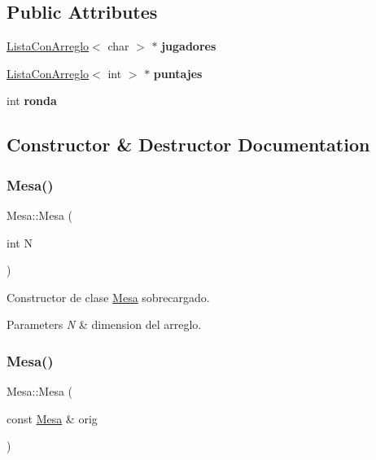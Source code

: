 \subsection*{Public Attributes}
\begin{DoxyCompactItemize}
\item 
\hypertarget{class_mesa_a7ccf2ba385f9a7b167b7f262ed1b1d91}{}\label{class_mesa_a7ccf2ba385f9a7b167b7f262ed1b1d91} 
\hyperlink{class_lista_con_arreglo}{Lista\+Con\+Arreglo}$<$ char $>$ $\ast$ {\bfseries jugadores}
\item 
\hypertarget{class_mesa_af3babe5df4e164206cf5c32138fb3516}{}\label{class_mesa_af3babe5df4e164206cf5c32138fb3516} 
\hyperlink{class_lista_con_arreglo}{Lista\+Con\+Arreglo}$<$ int $>$ $\ast$ {\bfseries puntajes}
\item 
\hypertarget{class_mesa_a1fc67802b221fd42d6a979c2bfc4833d}{}\label{class_mesa_a1fc67802b221fd42d6a979c2bfc4833d} 
int {\bfseries ronda}
\end{DoxyCompactItemize}


\subsection{Constructor \& Destructor Documentation}
\hypertarget{class_mesa_a8cb7a7932e52b13242eaa5ade9f646cb}{}\label{class_mesa_a8cb7a7932e52b13242eaa5ade9f646cb} 
\subsubsection{\texorpdfstring{Mesa()}{Mesa()}\hspace{0.1cm}{\footnotesize\ttfamily [1/2]}}
{\ttfamily Mesa\+::\+Mesa (\begin{DoxyParamCaption}\item[{int}]{N }\end{DoxyParamCaption})}



Constructor de clase \hyperlink{class_mesa}{Mesa} sobrecargado. 


\begin{DoxyParams}{Parameters}
{\em N} & dimension del arreglo. \\
\hline
\end{DoxyParams}
\hypertarget{class_mesa_af28f64b3a29b75d2a281dbc1d439a74e}{}\label{class_mesa_af28f64b3a29b75d2a281dbc1d439a74e} 
\subsubsection{\texorpdfstring{Mesa()}{Mesa()}\hspace{0.1cm}{\footnotesize\ttfamily [2/2]}}
{\ttfamily Mesa\+::\+Mesa (\begin{DoxyParamCaption}\item[{const \hyperlink{class_mesa}{Mesa} \&}]{orig }\end{DoxyParamCaption})}



